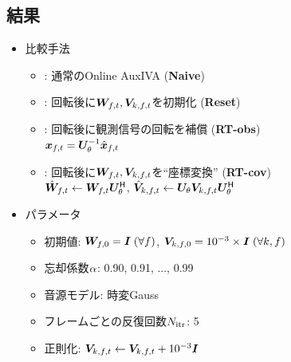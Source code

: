\documentclass[sip,biber]{now-journal}
\begin{document}
\subsection{結果}
\begin{itemize}
  \item 比較手法
    \begin{itemize}
      \item {}: 通常のOnline AuxIVA (\textbf{Naive})
      \item {}: 回転後に$\Demix _{\ft}, \cov _{\src,\ft}$を初期化 (\textbf{Reset})
      \item {}: 回転後に観測信号の回転を補償 (\textbf{RT-obs})\\
        $\Obs _{\ft} = \rotMat _{\rotDeg} ^{-1} \rotObs _{\ft}$
      \item {}: 回転後に$\Demix _{\ft}, \cov _{\src,\ft}$を``座標変換'' (\textbf{RT-cov})\\
        $\rotDemix _{\ft} \gets \Demix _{\ft} \rotMat _{\rotDeg} ^{\hermite}$,\; $\rotCov _{\src,\ft} \gets \rotMat _{\rotDeg} \cov _{\src,\ft} \rotMat _{\rotDeg} ^{\hermite}$
    \end{itemize}
  \item パラメータ
    \begin{itemize}
      \item 初期値: $\bm{W} _{f,0} = \bm{I}\; (\forall f)$, $\bm{V} _{k,f,0} = 10^{-3}\times\bm{I}\; (\forall k, f)$
      \item 忘却係数$\alpha$: 0.90, 0.91, ..., 0.99
      \item 音源モデル: 時変Gauss
      \item フレームごとの反復回数$N _{\mathrm{itr}}$: 5
      \item 正則化: $\cov _{\src,\ft} \gets \cov _{\src,\ft} + 10 ^{-3} \Eye$
    \end{itemize}
\end{itemize}
\end{document}
